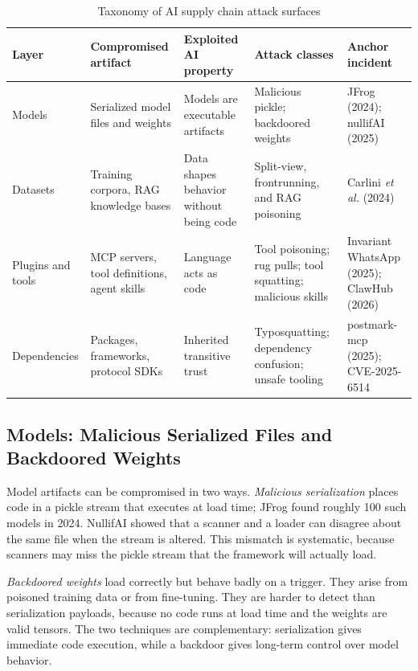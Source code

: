 \documentclass[conference]{IEEEtran}
\begin{document}
\begin{table}[!t]
\caption{Taxonomy of AI supply chain attack surfaces}
\label{tab:taxonomy}
\centering
\footnotesize
\renewcommand{\arraystretch}{1.2}
\begin{tabular}{L{2.0cm}L{3.4cm}L{3.1cm}L{4.0cm}L{3.5cm}}
\hline
\textbf{Layer} & \textbf{Compromised artifact} & \textbf{Exploited AI property} & \textbf{Attack classes} & \textbf{Anchor incident}\\
\hline
Models & Serialized model files and weights & Models are executable artifacts & Malicious pickle; backdoored weights & JFrog (2024); nullifAI (2025)\\
Datasets & Training corpora, RAG knowledge bases & Data shapes behavior without being code & Split-view, frontrunning, and RAG poisoning & Carlini \textit{et al.} (2024)\\
Plugins and tools & MCP servers, tool definitions, agent skills & Language acts as code & Tool poisoning; rug pulls; tool squatting; malicious skills & Invariant WhatsApp (2025); ClawHub (2026)\\
Dependencies & Packages, frameworks, protocol SDKs & Inherited transitive trust & Typosquatting; dependency confusion; unsafe tooling & postmark-mcp (2025); CVE-2025-6514\\
\hline
\end{tabular}
\end{table}

\subsection{Models: Malicious Serialized Files and Backdoored Weights}
\label{sec:tax-models}

Model artifacts can be compromised in two ways. \emph{Malicious serialization} places code in a pickle stream that executes at load time; JFrog found roughly 100 such models in 2024. NullifAI showed that a scanner and a loader can disagree about the same file when the stream is altered. This mismatch is systematic, because scanners may miss the pickle stream that the framework will actually load.

\emph{Backdoored weights} load correctly but behave badly on a trigger. They arise from poisoned training data or from fine-tuning. They are harder to detect than serialization payloads, because no code runs at load time and the weights are valid tensors. The two techniques are complementary: serialization gives immediate code execution, while a backdoor gives long-term control over model behavior.
\end{document}
